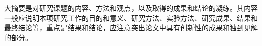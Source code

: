 
\begin{digest}
大摘要是对研究课题的内容、方法和观点，以及取得的成果和结论的凝练。其内容一般应说明本项研究工作的目的和意义、研究方法、实验方法、研究成果、结果和最终结论等，重点是结果和结论，应注意突出论文中具有创新性的成果和独到见解的部分。
\end{digest}

